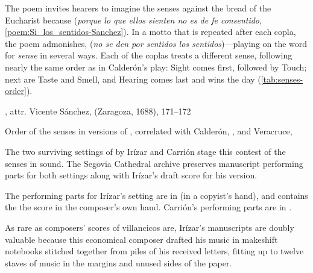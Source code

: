 The poem invites hearers to imagine the senses 
against the bread of the Eucharist because  (\emph{porque lo que ellos sienten no es de fe consentido},
\cref{poem:Si_los_sentidos-Sanchez}).%
    \Autocite[171--172]{Sanchez:LiraPoetica}
In a motto that is repeated after each copla, the poem admonishes,  (\emph{no se den por sentidos los sentidos})---playing
on the word for \emph{sense} in several ways.  
Each of the coplas treats a different sense, following nearly the same order as
in Calderón's play: Sight comes first, followed by Touch; next are Taste and
Smell, and Hearing comes last and wins the day (\cref{tab:senses-order}).

\begin{poemexample}

    \caption{, attr. Vicente
    Sánchez,  (Zaragoza, 1688), 171--172}
    
    \label{poem:Si_los_sentidos-Sanchez}

\end{poemexample}

\begin{table}
    \caption{Order of the senses in versions of ,
    correlated with Calderón, , and
    Veracruce, } 
    
    \label{tab:senses-order}

\end{table}

The two surviving settings of  by Irízar and Carrión
stage this contest of the senses in sound.
The Segovia Cathedral archive preserves manuscript performing parts for both
settings along with Irízar's draft score for his version.%
\begin{Footnote}
    The performing parts for Irízar's setting are in  (in a
    copyist's hand), and  contains the the score in the
    composer's own hand.
    Carrión's performing parts are in .
\end{Footnote}
As rare as composers' scores of villancicos are, Irízar's manuscripts are doubly
valuable because this economical composer drafted his music in makeshift
notebooks stitched together from piles of his received letters, fitting up to
twelve staves of music in the margins and unused sides of the paper.

